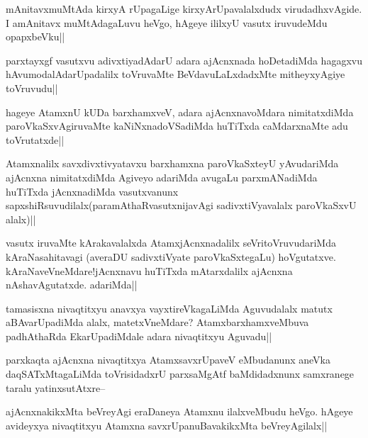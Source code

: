 
\begin{artha}
mAnitavxmuMtAda kirxyA rUpagaLige kirxyArUpavalalxdudx virudadhxvAgide. I amAnitavx muMtAdagaLuvu heVgo, hAgeye ililxyU vasutx iruvudeMdu opapxbeVku||
\end{artha}

\begin{artha}
parxtayxgf vasutxvu adivxtiyadAdarU adara ajAcnxnada hoDetadiMda hagagxvu hAvumodalAdarUpadalilx toVruvaMte BeVdavuLaLxdadxMte mitheyxyAgiye toVruvudu||
\end{artha}

\begin{artha}
hageye AtamxnU kUDa barxhamxveV, adara ajAcnxnavoMdara nimitatxdiMda paroVkaSxvAgiruvaMte kaNiNxnadoVSadiMda huTiTxda caMdarxnaMte adu toVrutatxde||
\end{artha}

\begin{artha}
Atamxnalilx savxdivxtivyatavxu barxhamxna paroVkaSxteyU yAvudariMda ajAcnxna nimitatxdiMda Agiveyo adariMda avugaLu parxmANadiMda huTiTxda jAcnxnadiMda vasutxvanunx sapxshiRsuvudilalx(paramAthaRvasutxnijavAgi sadivxtiVyavalalx paroVkaSxvU alalx)||
\end{artha}

\begin{artha}
vasutx iruvaMte kArakavalalxda AtamxjAcnxnadalilx seVritoVruvudariMda kAraNasahitavagi (averaDU sadivxtiVyate paroVkaSxtegaLu) hoVgutatxve. kAraNaveVneMdare!jAcnxnavu huTiTxda mAtarxdalilx ajAcnxna nAshavAgutatxde. adariMda||
\end{artha}


\begin{artha}
tamasisxna nivaqtitxyu anavxya vayxtireVkagaLiMda Aguvudalalx matutx aBAvarUpadiMda alalx, matetxVneMdare? AtamxbarxhamxveMbuva padhAthaRda EkarUpadiMdale adara nivaqtitxyu Aguvadu||
\end{artha}

\begin{artha}
parxkaqta ajAcnxna nivaqtitxya AtamxsavxrUpaveV eMbudanunx aneVka daqSATxMtagaLiMda toVrisidadxrU parxsaMgAtf baMdidadxnunx samxranege taralu yatinxsutAtxre--
\end{artha}

\begin{artha}
ajAcnxnakikxMta beVreyAgi eraDaneya Atamxnu ilalxveMbudu heVgo. hAgeye avideyxya nivaqtitxyu Atamxna savxrUpanuBavakikxMta beVreyAgilalx||
\end{artha}

